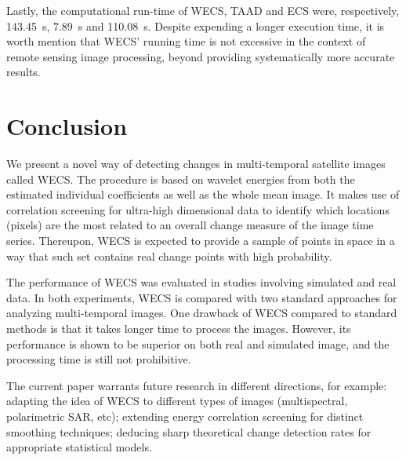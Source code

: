 \documentclass[journal]{IEEEtran}
\begin{document}
Lastly, the computational run-time of WECS, TAAD and ECS were, respectively, \SI{143.45}{\second}, \SI{7.89}{\second} and \SI{110.08}{\second}. Despite expending a longer execution time, it is worth mention that WECS' running time is not excessive in the context of remote sensing image processing, beyond providing systematically more accurate results.




\section{Conclusion}\label{section_discussion}


We present a novel way of detecting changes in multi-temporal satellite images called WECS. The procedure is based on wavelet energies from both the estimated individual coefficients as well as the whole mean image. It makes use of correlation screening for ultra-high dimensional data to identify which locations (pixels) are the most related to an overall change measure of the image time series. Thereupon, WECS is expected to provide a sample of points in space in a way that such set contains real change points with high probability. 

The performance of WECS was evaluated in studies involving simulated and real data. In both experiments, WECS is compared with two standard approaches for analyzing multi-temporal images. One drawback of WECS compared to standard methods is that it takes longer time to process the images. However, its performance is shown to be superior on both real and simulated image, and the processing time is still not prohibitive.

The current paper warrants future research in different directions, for example: adapting the idea of WECS to different types of images (multispectral, polarimetric SAR, etc); extending energy correlation screening for distinct smoothing techniques; deducing sharp theoretical change detection rates for appropriate statistical models.




\end{document}
